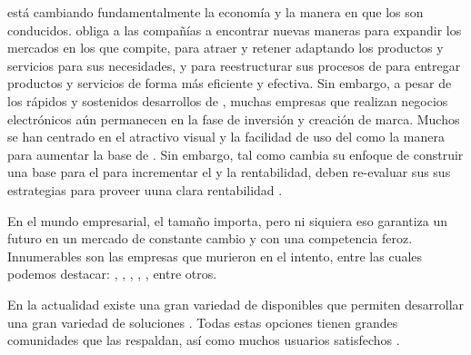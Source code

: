 			\ecommerceCOM está cambiando fundamentalmente la economía y la manera en que los \businessCOM son conducidos. \ecommerceCOM obliga a las compañías a encontrar nuevas maneras para expandir los mercados en los que compite, para atraer y retener \customersCOM adaptando los productos y servicios para sus necesidades, y para reestructurar sus procesos de \businessCOM para entregar productos y servicios de forma más eficiente y efectiva. Sin embargo, a pesar de los rápidos y sostenidos desarrollos de \ecommerceCOM, muchas empresas que realizan negocios electrónicos aún permanecen en la fase de inversión y creación de marca. Muchos \ebusinessCOM se han centrado en el atractivo visual y la facilidad de uso del \websiteINT como la manera para aumentar la base de \customersCOM. Sin embargo, tal como \ebusinessCOM cambia su enfoque de construir una base para el \customerCOM para incrementar el \revenueQA y la rentabilidad, deben re-evaluar sus sus estrategias para proveer uuna clara rentabilidad \cite{shin2001strategies}.

			En el mundo empresarial, el tamaño importa, pero ni siquiera eso garantiza un futuro en un mercado de constante cambio y con una competencia feroz. Innumerables son las empresas que murieron en el intento, entre las cuales podemos destacar: \sega, \kodak, \daewoo, \nokia, \blockbuster, entre otros.

			En la actualidad existe una gran variedad de \frameworksPC \openSourcePC disponibles que permiten desarrollar una gran variedad de soluciones \ecommerceCOM. Todas estas opciones tienen grandes comunidades que las respaldan, así como muchos usuarios satisfechos \citeAllFrameworks. 

